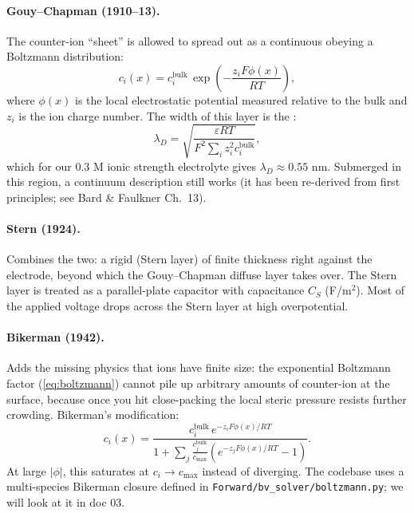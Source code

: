 \documentclass[11pt]{article}
\begin{document}
\paragraph{Gouy--Chapman (1910--13).}
The counter-ion ``sheet'' is allowed to spread out as a continuous
 obeying a Boltzmann distribution:
\begin{equation}
  c_i(x) = c_i^{\mathrm{bulk}}\,\exp\!\left(-\frac{z_i F \phi(x)}{RT}\right),
  \label{eq:boltzmann}
\end{equation}
where $\phi(x)$ is the local electrostatic potential measured
relative to the bulk and $z_i$ is the ion charge number. The width
of this layer is the :
\begin{equation}
  \lambda_D = \sqrt{\frac{\varepsilon RT}{F^2 \sum_i z_i^2 c_i^{\mathrm{bulk}}}},
  \label{eq:debye}
\end{equation}
which for our 0.3 M ionic strength electrolyte gives
$\lambda_D \approx 0.55$ nm. Submerged in this region, a continuum
description still works (it has been re-derived from first
principles; see Bard \& Faulkner Ch.\ 13).

\paragraph{Stern (1924).}
Combines the two: a rigid  (Stern layer) of
finite thickness right against the electrode, beyond which the
Gouy--Chapman diffuse layer takes over. The Stern layer is treated
as a parallel-plate capacitor with capacitance $C_S$
(F/m$^2$). Most of the applied voltage drops across the Stern
layer at high overpotential.

\paragraph{Bikerman (1942).}
Adds the missing physics that ions have finite size: the
exponential Boltzmann factor (\ref{eq:boltzmann}) cannot pile up
arbitrary amounts of counter-ion at the surface, because once you
hit close-packing the local steric pressure resists further
crowding. Bikerman's modification:
\begin{equation}
  c_i(x) = \frac{c_i^{\mathrm{bulk}}\,e^{-z_i F\phi(x)/RT}}
                {1 + \sum_j \frac{c_j^{\mathrm{bulk}}}{c_{\max}}
                       \left(e^{-z_j F\phi(x)/RT} - 1\right)}.
  \label{eq:bikerman}
\end{equation}
At large $|\phi|$, this saturates at $c_i \to c_{\max}$ instead of
diverging. The codebase uses a multi-species Bikerman closure
defined in \texttt{Forward/bv\_solver/boltzmann.py}; we will look at
it in doc 03.
\end{document}
